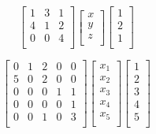 \documentclass[12pt]{article}
\begin{document}
  
\begin{equation}
    \begin{bmatrix}
        1       &   3       &   1   \\
        4       &   1       &   2   \\
        0       &   0       &   4   \\
    \end{bmatrix}
    \begin{bmatrix}
        x       \\
        y       \\
        z       \\
    \end{bmatrix}
    \begin{bmatrix}
        1       \\
        2       \\
        1       \\
    \end{bmatrix}
\end{equation}

\begin{equation}
    \begin{bmatrix}
        0       &   1       &   2   &   0   &   0   \\
        5       &   0       &   2   &   0   &   0   \\
        0       &   0       &   0   &   1   &   1   \\
        0       &   0       &   0   &   0   &   1   \\
        0       &   0       &   1   &   0   &   3   \\
    \end{bmatrix}
    \begin{bmatrix}
        x_{1}   \\
        x_{2}   \\
        x_{3}   \\
        x_{4}   \\
        x_{5}   \\
    \end{bmatrix}
    \begin{bmatrix}
        1       \\
        2       \\
        3       \\
        4       \\
        5       \\
    \end{bmatrix}
\end{equation}
\newpage
\end{document}
